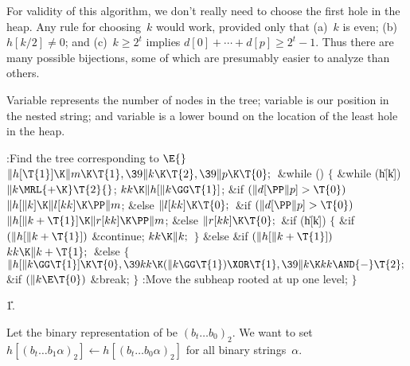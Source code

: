 For validity of this algorithm, we don't really need to choose the
first hole in the heap. Any rule for choosing~$k$ would work, provided only
that (a)~$k$ is even; (b)~$h[k/2]\ne0$; and
(c)~$k\ge 2^t$ implies $d[0]+\cdots+d[p]\ge 2^t-1$. Thus there are many
possible bijections, some of which are presumably easier
to analyze than others.

\fi

Variable  represents the number of nodes in the
tree; variable 
is our position in the nested string; and variable  is a lower bound
on the location of the least hole in the heap.

\Y\B\4:Find the tree corresponding to \X${}\E{}$\6
$\|h[\T{1}]\K\|m\K\T{1},\39\|k\K\T{2},\39\|p\K\T{0};{}$\6
\&{while} ()\5
${}\{{}$\1\6
\&{while} (\|h[\|k])\1\5
${}\|k\MRL{+{\K}}\T{2}{}$;\2\6
${}\\{kk}\K\|h[\|k\GG\T{1}]{}$;\6
\&{if} ${}(\|d[\PP\|p]>\T{0}){}$\1\5
${}\|h[\|k]\K\|l[\\{kk}]\K\PP\|m{}$;\5
\2\&{else}\1\5
${}\|l[\\{kk}]\K\T{0};{}$\2\6
\&{if} ${}(\|d[\PP\|p]>\T{0}){}$\1\5
${}\|h[\|k+\T{1}]\K\|r[\\{kk}]\K\PP\|m{}$;\5
\2\&{else}\1\5
${}\|r[\\{kk}]\K\T{0};{}$\2\6
\&{if} (\|h[\|k])\5
${}\{{}$\1\6
\&{if} ${}(\|h[\|k+\T{1}]){}$\1\5
\&{continue};\2\6
${}\\{kk}\K\|k;{}$\6
\4${}\}{}$\5
\2\&{else} \&{if} ${}(\|h[\|k+\T{1}]){}$\1\5
${}\\{kk}\K\|k+\T{1};{}$\2\6
\&{else}\5
${}\{{}$\1\6
${}\|h[\|k\GG\T{1}]\K\T{0},\39\\{kk}\K(\|k\GG\T{1})\XOR\T{1},\39\|k\K\\{kk}%
\AND{-}\T{2};{}$\6
\&{if} ${}(\|k\E\T{0}){}$\1\5
\&{break};\2\6
\4${}\}{}$\2\6
:Move the subheap rooted at  up one level\X;\6
\4${}\}{}$\2\par
\U1.\fi

Let the binary representation of  be $(b_t\ldots
b_0)_2$.
We want to set $h[(b_t\ldots b_1\alpha)_2]\gets h[(b_t\ldots b_0\alpha)_2]$
for all binary strings~$\alpha$.

